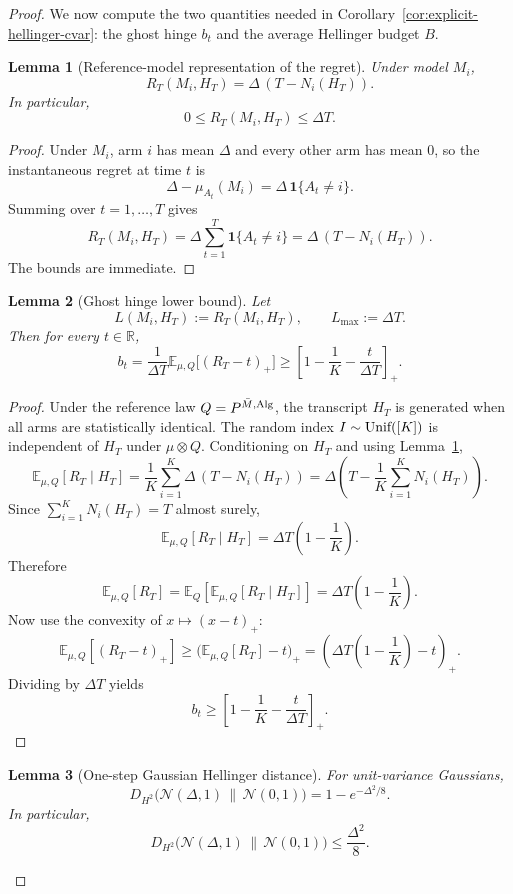 \documentclass[conference]{IEEEtran}
\newtheorem{lemma}{Lemma}
\begin{document}
\begin{proof}[Proof]
We now compute the two quantities needed in Corollary~\ref{cor:explicit-hellinger-cvar}:
the ghost hinge $b_t$ and the average Hellinger budget $B$.

\begin{lemma}[Reference-model representation of the regret]
\label{lem:bandit-regret-form}
Under model $M_i$,
\[
R_T(M_i,H_T)=\Delta\,(T-N_i(H_T)).
\]
In particular,
\[
0\le R_T(M_i,H_T)\le \Delta T.
\]
\end{lemma}

\begin{proof}
Under $M_i$, arm $i$ has mean $\Delta$ and every other arm has mean $0$, so the instantaneous regret at time $t$ is
\[
\Delta - \mu_{A_t}(M_i)
=
\Delta\,\mathbf 1\{A_t\neq i\}.
\]
Summing over $t=1,\dots,T$ gives
\[
R_T(M_i,H_T)=\Delta \sum_{t=1}^T \mathbf 1\{A_t\neq i\}
=\Delta\,(T-N_i(H_T)).
\]
The bounds are immediate.
\end{proof}

\begin{lemma}[Ghost hinge lower bound]
\label{lem:ghost-hinge-bandit}
Let
\[
L(M_i,H_T):=R_T(M_i,H_T),
\qquad
L_{\max}:=\Delta T.
\]
Then for every $t\in\mathbb R$,
\[
b_t
=
\frac{1}{\Delta T}\mathbb{E}_{\mu,Q}\bigl[(R_T-t)_+\bigr]
\ge
\left[1-\frac1K-\frac{t}{\Delta T}\right]_+.
\]
\end{lemma}

\begin{proof}
Under the reference law $Q=P^{\bar M,\textup{Alg}}$, the transcript $H_T$ is generated when all arms are statistically identical.
The random index $I\sim\textup{Unif}([K])$ is independent of $H_T$ under $\mu\otimes Q$.
Conditioning on $H_T$ and using Lemma~\ref{lem:bandit-regret-form},
\[
\mathbb{E}_{\mu,Q}[R_T\mid H_T]
=
\frac1K\sum_{i=1}^K \Delta\,(T-N_i(H_T))
=
\Delta\left(T-\frac1K\sum_{i=1}^K N_i(H_T)\right).
\]
Since $\sum_{i=1}^K N_i(H_T)=T$ almost surely,
\[
\mathbb{E}_{\mu,Q}[R_T\mid H_T]
=
\Delta T\left(1-\frac1K\right).
\]
Therefore
\[
\mathbb{E}_{\mu,Q}[R_T] = 
\mathbb{E}_{Q}\!\left[\mathbb{E}_{\mu,Q}[R_T\mid H_T]\right]
=
\Delta T\left(1-\frac1K\right).
\]
Now use the convexity of $x\mapsto (x-t)_+$:
\[
\mathbb{E}_{\mu,Q}[(R_T-t)_+]
\ge
\bigl(\mathbb{E}_{\mu,Q}[R_T]-t\bigr)_+
=
\left(\Delta T\left(1-\frac1K\right)-t\right)_+.
\]
Dividing by $\Delta T$ yields
\[
b_t\ge \left[1-\frac1K-\frac{t}{\Delta T}\right]_+.
\]
\end{proof}

\begin{lemma}[One-step Gaussian Hellinger distance]
\label{lem:gaussian-hellinger}
For unit-variance Gaussians,
\[
D_{H^2}\bigl(\mathcal N(\Delta,1)\,\|\,\mathcal N(0,1)\bigr)
=
1-e^{-\Delta^2/8}.
\]
In particular,
\[
D_{H^2}\bigl(\mathcal N(\Delta,1)\,\|\,\mathcal N(0,1)\bigr)
\le \frac{\Delta^2}{8}.
\]
\end{lemma}


\end{proof}
\end{document}

